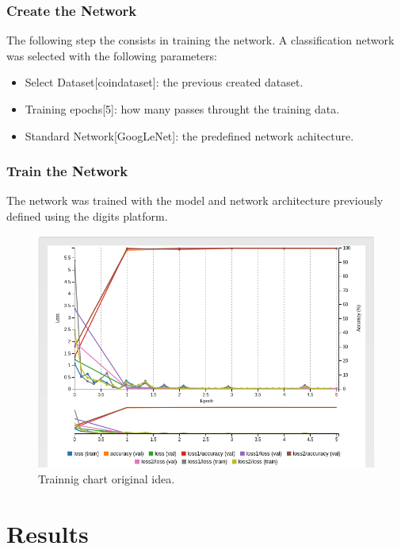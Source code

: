 \documentclass[10pt,journal,compsoc]{IEEEtran}
\begin{document}
\subsubsection{Create the Network}

The following step the consists in training the network. A classification network was selected with the following parameters:

\begin{itemize}
\item Select Dataset[coin\-dataset]: the previous created dataset.
\item Training epochs[5]: how many passes throught the training data.
\item Standard Network[GoogLeNet]: the predefined network achitecture.
\end{itemize}

\subsubsection{Train the Network}

The network was trained with the model and network architecture previously defined using the digits platform.

\begin{figure}[h]
\centering
\includegraphics[scale=0.3]{trainning-chart-udacity}
\caption{Trainnig chart original idea.}
\label{fig:figure3}
\end{figure}

\section{Results}
\end{document}
